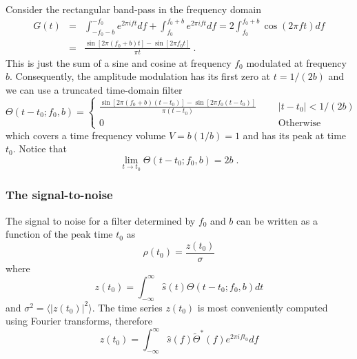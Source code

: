 Consider the rectangular band-pass in the frequency domain
\begin{eqnarray}
G(t) &=& \int_{-f_0 - b}^{-f_0} e^{2 \pi i f t} df  +
\int_{f_0}^{f_0+b}  e^{2 \pi i f t} df 
= 2 \int_{f_0}^{f_0+b} \cos ( 2 \pi f t ) df \\
&=& \frac{\sin[2\pi(f_0+b)t] - \sin[2 \pi f_0 t]}{\pi t} \; .
\end{eqnarray}
This is just the sum of a sine and cosine at
frequency $f_0$ modulated at frequency $b$.
Consequently,  the amplitude modulation has its first zero at
$t = 1/ (2 b)$ and we can use a truncated time-domain filter
\begin{equation}
\Theta(t - t_0; f_0 , b) = \left\{
\begin{array}{lrl}
\displaystyle{
\frac{\sin[2\pi(f_0+b)(t-t_0)] - \sin[2 \pi f_0 (t-t_0)]}{\pi (t-t_0)} 
} & \mbox{\ \ } & |t-t_0| < 1/(2b)  \\
0 & & \textrm{Otherwise}
\end{array} \right. 
\end{equation}
which covers a time frequency volume $V = b (1/b) = 1$ and has its
peak at time $t_0$.   Notice that
\begin{equation}
\lim_{t\rightarrow t_0} \Theta(t - t_0; f_0 , b) = 2 b\; .
\end{equation}

\subsubsection{The signal-to-noise}

The signal to noise for a filter determined by $f_0$ and $b$ can be
written as a function of the peak time $t_0$ as
\begin{equation}
\rho(t_0) = \frac{z(t_0)}{\sigma}
\end{equation}
where
\begin{equation}
z(t_0) = \int_{-\infty}^\infty \hat{s}(t) \Theta(t-t_0; f_0, b) 
dt
\end{equation} and $\sigma^2 = \langle |z(t_0)|^2 \rangle$.  The time
series $z(t_0)$ is most conveniently computed using Fourier
transforms,  therefore
\begin{equation}
z(t_0) = \int_{-\infty}^{\infty} \hat{s}(f) \tilde{\Theta}^\ast (f) 
e^{2 \pi i ft_0} df
\end{equation}

